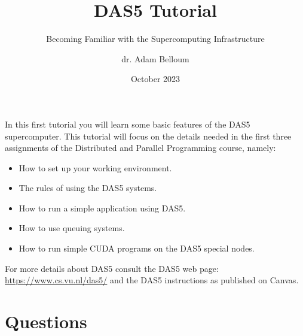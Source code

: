 \documentclass[parskip]{scrartcl}
\title{DAS5 Tutorial}
\subtitle{Becoming Familiar with the Supercomputing Infrastructure}
\author{dr. Adam Belloum}
\date{October 2023}
\begin{document}
\maketitle

In this first tutorial you will learn some basic features of the DAS5  supercomputer. This tutorial will focus on the details needed in the first three
assignments of the Distributed and Parallel Programming course, namely:

\begin{itemize}
\item How to set up your working environment.
\item The rules of using the DAS5 systems.
\item How to run a simple application using DAS5.
\item How to use queuing systems.
\item How to run simple CUDA programs on the DAS5 special nodes.
\end{itemize}

For more details about DAS5 consult the DAS5 web page: \url{https://www.cs.vu.nl/das5/} and the DAS5 instructions as published on Canvas.  

\section*{Questions}
\end{document}
